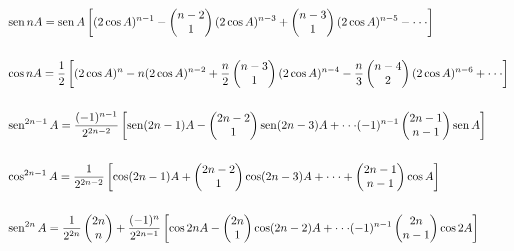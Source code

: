 \begin{align*}
&\sen nA = \sen A \left[  (2\cos A)^{n-1}-\begin{pmatrix}n-2 \\1\end{pmatrix} (2\cos A)^{n-3}+\begin{pmatrix}n-3 \\1\end{pmatrix}(2\cos A)^{n-5} - \cdot \cdot \cdot  \right]\\\\
&\cos nA = \frac{1}{2} \left[  (2\cos A)^{n}- n (2\cos A)^{n-2}+\frac{n}{2}\begin{pmatrix}n-3 \\1\end{pmatrix}(2\cos A)^{n-4} - \frac{n}{3}\begin{pmatrix}n-4 \\2\end{pmatrix}(2\cos A)^{n-6} +\cdot \cdot \cdot  \right]\\\\
&\sen^{2n-1} A = \frac{(-1)^{n-1}}{2^{2n-2}} \left[ \sen (2n-1)A - \begin{pmatrix}2n-2 \\1\end{pmatrix}\sen (2n-3)A+\cdot \cdot \cdot (-1)^{n-1}\begin{pmatrix}2n-1 \\n-1\end{pmatrix}\sen A \right] \\\\
&\cos^{2n-1} A = \frac{1}{2^{2n-2}} \left[ \cos (2n-1)A + \begin{pmatrix}2n-2 \\1\end{pmatrix}\cos (2n-3)A+\cdot \cdot \cdot +\begin{pmatrix}2n-1 \\n-1\end{pmatrix}\cos A \right] \\\\
&\sen^{2n} A = \frac{1}{2^{2n}}\begin{pmatrix}2n \\n\end{pmatrix}+\frac{(-1)^{n}}{2^{2n-1}}\left[ \cos 2nA - \begin{pmatrix}2n \\1\end{pmatrix}\cos (2n-2)A + \cdot \cdot \cdot (-1)^{n-1}\begin{pmatrix}2n \\n-1\end{pmatrix} \cos 2A \right]\\\\

\end{align*}
